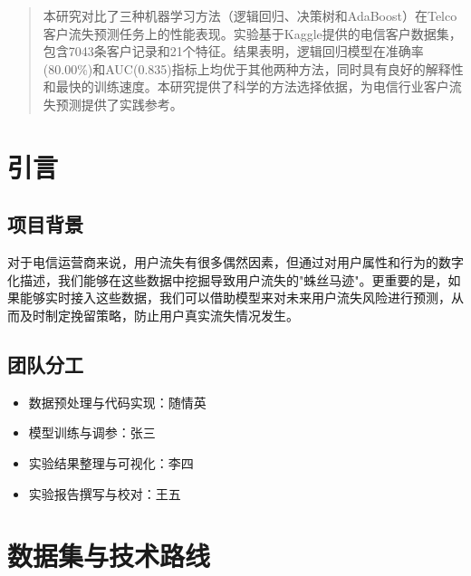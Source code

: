 \documentclass{article}
\begin{document}

\printAffiliationsAndNotice{}

\begin{abstract}
本研究对比了三种机器学习方法（逻辑回归、决策树和AdaBoost）在Telco客户流失预测任务上的性能表现。实验基于Kaggle提供的电信客户数据集，包含7043条客户记录和21个特征。结果表明，逻辑回归模型在准确率(80.00\%)和AUC(0.835)指标上均优于其他两种方法，同时具有良好的解释性和最快的训练速度。本研究提供了科学的方法选择依据，为电信行业客户流失预测提供了实践参考。
\end{abstract}

\section{引言}

\subsection{项目背景}
对于电信运营商来说，用户流失有很多偶然因素，但通过对用户属性和行为的数字化描述，我们能够在这些数据中挖掘导致用户流失的"蛛丝马迹"。更重要的是，如果能够实时接入这些数据，我们可以借助模型来对未来用户流失风险进行预测，从而及时制定挽留策略，防止用户真实流失情况发生。

\subsection{团队分工}
\begin{itemize}
    \item 数据预处理与代码实现：随情英
    \item 模型训练与调参：张三
    \item 实验结果整理与可视化：李四
    \item 实验报告撰写与校对：王五
\end{itemize}

\section{数据集与技术路线}
\end{document}
